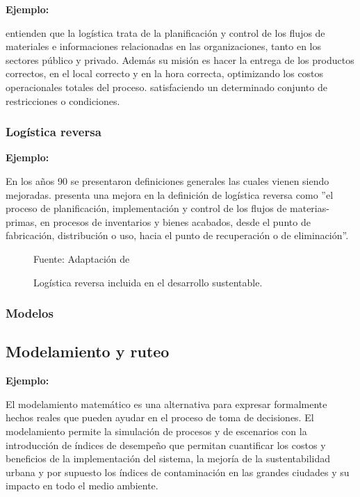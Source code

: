 {\bf Ejemplo:}\par

\cite{Ghiani} entienden que la logística trata de la planificación y control de los flujos de materiales e informaciones relacionadas en las organizaciones, tanto en los sectores público y privado. Además su misión es hacer la entrega de los productos correctos, en el local correcto y en la hora correcta, optimizando los costos operacionales totales del proceso.
satisfaciendo un determinado conjunto de restricciones o condiciones.\par

\subsubsection{Logística reversa}

{\bf Ejemplo:}\par

En los años 90 se presentaron definiciones generales las cuales vienen siendo mejoradas. \cite{Dekker} presenta una mejora en la definición de logística reversa como  ”el proceso de planificación, implementación y control de los flujos de materias-primas, en procesos de inventarios y bienes acabados, desde el punto de fabricación, distribución o uso, hacia el punto de recuperación o de eliminación”. 
\begin{figure}[ht]
\begin{center}
\end{center}
\begin{center}
\vskip -0.5cm
\caption{\small{Logística reversa incluida en el desarrollo sustentable.}}
{\small{Fuente: Adaptación de \cite{Tanguay}}}
\end{center}
\end{figure}


\subsubsection{Modelos}

\subsection{Modelamiento y ruteo }

{\bf Ejemplo:}\par

El modelamiento matemático es una alternativa para expresar formalmente hechos reales que pueden ayudar en el proceso de toma de decisiones. El modelamiento permite la simulación de procesos  y de escenarios con la introducción de índices de desempeño que permitan cuantificar los costos y beneficios de la implementación del sistema, la mejoría de la sustentabilidad urbana y por supuesto los índices de contaminación en las grandes ciudades y su impacto en todo el medio ambiente. 

